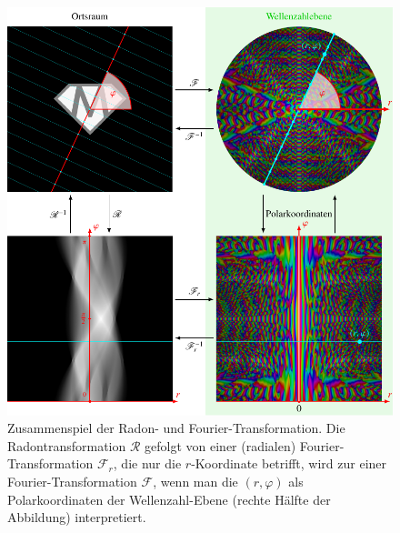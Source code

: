 %
%
%
\begin{figure}
\centering
\includegraphics[width=\textwidth]{chapters/050-radon/images/radonft.pdf}
\caption{Zusammenspiel der Radon- und Fourier-Transformation.
Die Radontransformation $\mathscr{R}$ gefolgt von einer (radialen)
Fourier-Transformation $\mathscr{F}_r$, die nur die $r$-Koordinate
betrifft, wird zur einer Fourier-Transformation $\mathscr{F}$, wenn
man die $(r,\varphi)$ als Polarkoordinaten der Wellenzahl-Ebene
(rechte Hälfte der Abbildung) interpretiert.
\label{buch:radon:definition:fig:radonft}}
\end{figure}
